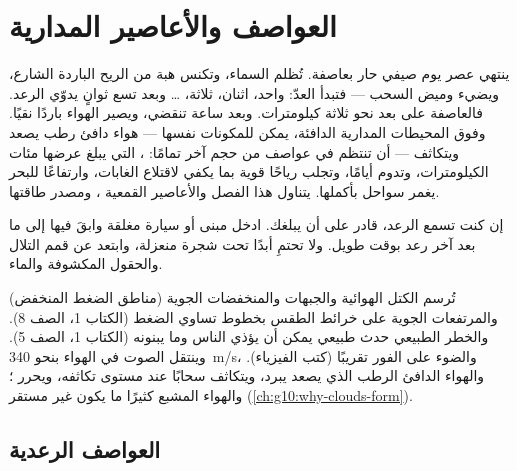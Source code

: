 \chapter{العواصف والأعاصير المدارية}\label{ch:g10:storms-and-cyclones}

ينتهي عصر يوم صيفي حار بعاصفة. تُظلم السماء، وتكنس هبة من الريح الباردة الشارع،
ويضيء وميض السحب --- فتبدأ العدّ: واحد، اثنان، ثلاثة، \ldots{} وبعد تسع ثوانٍ
يدوّي الرعد. فالعاصفة على بعد نحو ثلاثة كيلومترات. وبعد ساعة تنقضي، ويصير الهواء
باردًا نقيًا. وفوق المحيطات المدارية الدافئة، يمكن للمكونات نفسها --- هواء دافئ
رطب يصعد ويتكاثف --- أن تنتظم في عواصف من حجم آخر تمامًا: ، التي
يبلغ عرضها مئات الكيلومترات، وتدوم أيامًا، وتجلب رياحًا قوية بما يكفي لاقتلاع
الغابات، وارتفاعًا للبحر يغمر سواحل بأكملها. يتناول هذا الفصل 
والأعاصير القمعية ، ومصدر طاقتها.

\begin{safety}
إن كنت تسمع الرعد،  قادر على أن يبلغك. ادخل مبنى أو سيارة مغلقة وابقَ فيها
إلى ما بعد آخر رعد بوقت طويل. ولا تحتمِ أبدًا تحت شجرة منعزلة، وابتعد عن قمم
التلال والحقول المكشوفة والماء.
\end{safety}

\begin{recall}
تُرسم الكتل الهوائية والجبهات والمنخفضات الجوية (مناطق الضغط المنخفض) والمرتفعات
الجوية على خرائط الطقس بخطوط تساوي الضغط (الكتاب 1، الصف 8). والخطر الطبيعي حدث
طبيعي يمكن أن يؤذي الناس وما يبنونه (الكتاب 1، الصف 5). وينتقل الصوت في الهواء
بنحو \qty{340}{m/s}، والضوء على الفور تقريبًا (كتب الفيزياء). والهواء الدافئ
الرطب الذي يصعد يبرد، ويتكاثف سحابًا عند مستوى تكاثفه، ويحرر ؛ والهواء
المشبع كثيرًا ما يكون غير مستقر
(\cref{ch:g10:why-clouds-form}).
\end{recall}

\section{العواصف الرعدية}

